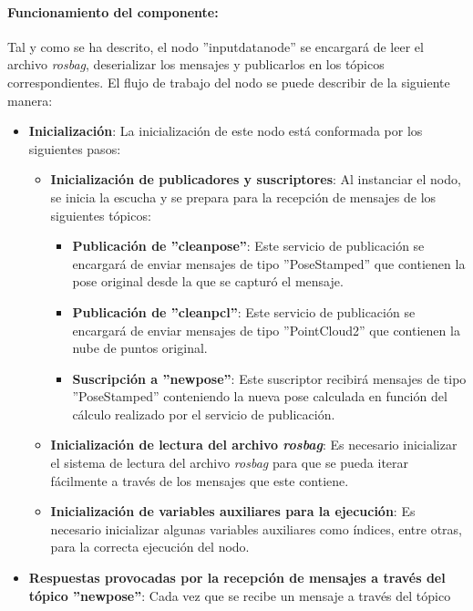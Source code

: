 \documentclass[12pt, a4paper, twoside]{article}
\begin{document}
\paragraph{Funcionamiento del componente:}
Tal y como se ha descrito, el nodo ''input\textunderscore data\textunderscore node'' se encargará de leer el archivo \textit{rosbag}, deserializar los mensajes y
publicarlos en los tópicos correspondientes. El flujo de trabajo del nodo se puede describir de la siguiente manera:
\begin{itemize}
  \item \textbf{Inicialización}: La inicialización de este nodo está conformada por los siguientes pasos:
  \begin{itemize}
    \item \textbf{Inicialización de publicadores y suscriptores}: Al instanciar el nodo, se inicia la escucha y se prepara para la recepción de mensajes de los 
    siguientes tópicos:
    \begin{itemize}
      \item \textbf{Publicación de ''clean\textunderscore pose''}: Este servicio de publicación se encargará de enviar mensajes de tipo ''PoseStamped'' que 
      contienen la pose original desde la que se capturó el mensaje.
      \item \textbf{Publicación de ''clean\textunderscore pcl''}: Este servicio de publicación se encargará de enviar mensajes de tipo ''PointCloud2'' que 
      contienen la nube de puntos original.
      \item \textbf{Suscripción a ''new\textunderscore pose''}: Este suscriptor recibirá mensajes de tipo ''PoseStamped'' conteniendo la nueva pose calculada en función 
      del cálculo realizado por el servicio de publicación.
    \end{itemize}
    \item \textbf{Inicialización de lectura del archivo \textit{rosbag}}: Es necesario inicializar el sistema de lectura del archivo \textit{rosbag} para que se pueda iterar fácilmente
    a través de los mensajes que este contiene.
    \item \textbf{Inicialización de variables auxiliares para la ejecución}: Es necesario inicializar algunas variables auxiliares como índices, entre otras,  
    para la correcta ejecución del nodo.
  \end{itemize}
  \item \textbf{Respuestas provocadas por la recepción de mensajes a través del tópico ''new\textunderscore pose''}: Cada vez que se recibe un mensaje a través del tópico 

\end{itemize}
\end{document}
